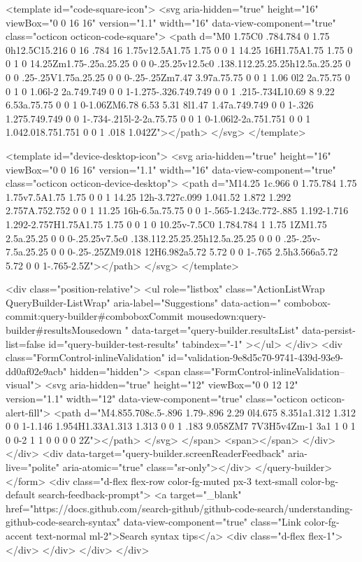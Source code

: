 <template id="code-square-icon">
  <svg aria-hidden="true" height="16" viewBox="0 0 16 16" version="1.1" width="16" data-view-component="true" class="octicon octicon-code-square">
    <path d="M0 1.75C0 .784.784 0 1.75 0h12.5C15.216 0 16 .784 16 1.75v12.5A1.75 1.75 0 0 1 14.25 16H1.75A1.75 1.75 0 0 1 0 14.25Zm1.75-.25a.25.25 0 0 0-.25.25v12.5c0 .138.112.25.25.25h12.5a.25.25 0 0 0 .25-.25V1.75a.25.25 0 0 0-.25-.25Zm7.47 3.97a.75.75 0 0 1 1.06 0l2 2a.75.75 0 0 1 0 1.06l-2 2a.749.749 0 0 1-1.275-.326.749.749 0 0 1 .215-.734L10.69 8 9.22 6.53a.75.75 0 0 1 0-1.06ZM6.78 6.53 5.31 8l1.47 1.47a.749.749 0 0 1-.326 1.275.749.749 0 0 1-.734-.215l-2-2a.75.75 0 0 1 0-1.06l2-2a.751.751 0 0 1 1.042.018.751.751 0 0 1 .018 1.042Z"></path>
</svg>
</template>

<template id="device-desktop-icon">
  <svg aria-hidden="true" height="16" viewBox="0 0 16 16" version="1.1" width="16" data-view-component="true" class="octicon octicon-device-desktop">
    <path d="M14.25 1c.966 0 1.75.784 1.75 1.75v7.5A1.75 1.75 0 0 1 14.25 12h-3.727c.099 1.041.52 1.872 1.292 2.757A.752.752 0 0 1 11.25 16h-6.5a.75.75 0 0 1-.565-1.243c.772-.885 1.192-1.716 1.292-2.757H1.75A1.75 1.75 0 0 1 0 10.25v-7.5C0 1.784.784 1 1.75 1ZM1.75 2.5a.25.25 0 0 0-.25.25v7.5c0 .138.112.25.25.25h12.5a.25.25 0 0 0 .25-.25v-7.5a.25.25 0 0 0-.25-.25ZM9.018 12H6.982a5.72 5.72 0 0 1-.765 2.5h3.566a5.72 5.72 0 0 1-.765-2.5Z"></path>
</svg>
</template>

        <div class="position-relative">
                <ul
                  role="listbox"
                  class="ActionListWrap QueryBuilder-ListWrap"
                  aria-label="Suggestions"
                  data-action="
                    combobox-commit:query-builder#comboboxCommit
                    mousedown:query-builder#resultsMousedown
                  "
                  data-target="query-builder.resultsList"
                  data-persist-list=false
                  id="query-builder-test-results"
                  tabindex="-1"
                ></ul>
        </div>
      <div class="FormControl-inlineValidation" id="validation-9e8d5c70-9741-439d-93e9-dd0af02e9acb" hidden="hidden">
        <span class="FormControl-inlineValidation--visual">
          <svg aria-hidden="true" height="12" viewBox="0 0 12 12" version="1.1" width="12" data-view-component="true" class="octicon octicon-alert-fill">
    <path d="M4.855.708c.5-.896 1.79-.896 2.29 0l4.675 8.351a1.312 1.312 0 0 1-1.146 1.954H1.33A1.313 1.313 0 0 1 .183 9.058ZM7 7V3H5v4Zm-1 3a1 1 0 1 0 0-2 1 1 0 0 0 0 2Z"></path>
</svg>
        </span>
        <span></span>
</div>    </div>
    <div data-target="query-builder.screenReaderFeedback" aria-live="polite" aria-atomic="true" class="sr-only"></div>
</query-builder></form>
          <div class="d-flex flex-row color-fg-muted px-3 text-small color-bg-default search-feedback-prompt">
            <a target="_blank" href="https://docs.github.com/search-github/github-code-search/understanding-github-code-search-syntax" data-view-component="true" class="Link color-fg-accent text-normal ml-2">Search syntax tips</a>            <div class="d-flex flex-1"></div>
          </div>
        </div>
</div>

